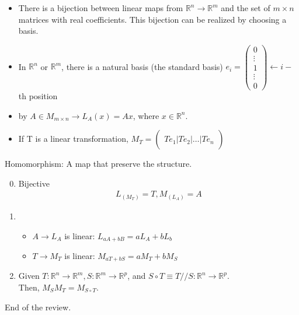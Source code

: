 \documentclass[a4paper]{article}
\numberwithin{equation}{section}
\newcommand{\R}{\mathbb{R}}
\begin{document}
\begin{itemize}
    \item There is a bijection between linear maps from $\R^n\to\R^m$ and the set of $m\times n$ matrices with real coefficients. This bijection can be realized by choosing a basis. 
    \item In $\R^n$ or $\R^m$, there is a natural basis (the standard basis) $e_i=\begin{pmatrix}
        0\\
        \vdots\\
        1\\
        \vdots\\
        0
    \end{pmatrix}\leftarrow i-$th position
    \item by $A\in M_{m\times n}\to L_A(x)=Ax$, where $x\in\R^n$.
    \item If T is a linear transformation, $M_T=\begin{pmatrix}\:\\
        Te_1|Te_2|\dots|Te_n\\\:
    \end{pmatrix}$
\end{itemize}
\begin{definition}
    Homomorphism: A map that preserve the structure.
\end{definition}
\begin{theorem}
    \begin{enumerate}
        \setcounter{enumi}{-1}
        \item Bijective
        \begin{align}
            L_{(M_T)}=T, M_{(L_A)}=A
        \end{align}
        \item \begin{itemize}
            \item $A\to L_A$ is linear: $L_{aA+bB}=aL_A+bL_b$
            \item $T\to M_T$ is linear: $M_{aT+bS}=aM_T+bM_S$
        \end{itemize}
        \item Given $T: \R^n\to\R^m, S:\R^m\to\R^p$, and $S\circ T\equiv T//S: \R^n\to\R^p$.\\
        Then, $M_SM_T=M_{S\circ T}$.
    \end{enumerate}
\end{theorem}

End of the review.
\end{document}
